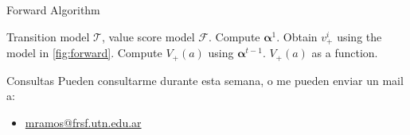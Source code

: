 \documentclass{beamer}
\begin{document}
\begin{frame}[fragile]{Forward Algorithm}
\begin{algorithm}[H]%
\small
\caption{Forward algorithm.}
\label{alg:algorithm}
\begin{algorithmic}%

\REQUIRE Transition model $\mathcal{T}$, value score model $\mathcal{F}$.
\STATE Compute $\bm{\alpha}^1$.
    \STATE Obtain $v_+^i$ using the model in \ref{fig:forward}.
        \STATE Compute $V_+(a)$ using $\bm{\alpha}^{t-1}$.
    \ENDIF
\ENDFOR
\RETURN $V_+(a)$ as a function.

\end{algorithmic}
\end{algorithm}
\end{frame}


\begin{frame}{Consultas}
Pueden consultarme durante esta semana, o me pueden enviar un mail a:
        \begin{itemize}
            \item \href{mailto:mramos@frsf.utn.edu.ar}{mramos@frsf.utn.edu.ar}
        \end{itemize}
\end{frame}
\end{document}
